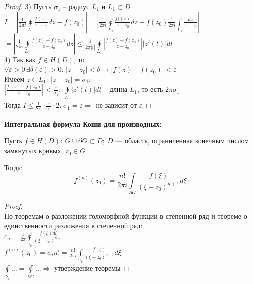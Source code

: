 \begin{proof}
    3) Пусть $\sigma_1$ -- радиус $L_1$ и $L_1 \subset D$\\
    $I = \left| \frac{1}{2\pi i } \oint\limits_{L_1} \frac{f(z)}{z-z_0}dz-f(z_0) \right| = \left| \frac{1}{2\pi i} \oint\limits_{L_1} \frac{f)(z)}{z-z_0}dz - f(z_0)\frac{1}{2\pi i}\int\limits_{L_1} \frac{dz}{z-z_0}\right| = $\\
    $= \left| \frac{1}{2\pi i}\oint\limits_{L_1} \frac{f(z)-f(z_0)}{z-z_0}dz \right| \leq \frac{1}{2\pi |i|} \oint\limits_{L_1}\left| \frac{f(z)-f(z_0)}{z-z_0} \right||z'(t)|dt$\\

    4) Так как $f \in H(D)$, то $\forall \varepsilon > 0 \, \exists \delta (\varepsilon)>0: \, |z-z_0|<\delta \rightarrow |f(z)-f(z_0)|<\varepsilon$\\
    Имеем $z\in L_1: \ |z-z_0| = \sigma_1$:\\
    $\left| \frac{f(z)-f(z_0)}{z-z_0} \right|< \frac{\varepsilon}{\sigma_1}: \ \oint\limits_{L_1}|z'(t)|dt$ -- длина $L_1$, то есть $2\pi \sigma_1$\\
    Тогда $I \leq \frac{1}{2\pi}\cdot \frac{\varepsilon}{\gamma_1}\cdot 2\pi \sigma_1 = \varepsilon \Rightarrow$ не зависит от $\varepsilon$ 

\end{proof}
\textbf{Интегральная формула Коши для производных:}

Пусть $f\in H(D): \ G\cup \partial G \subset D; \ D$ --- область, ограниченная конечным числом замкнутых кривых, $z_0 \in G$

Тогда:
$$f^{(n)}(z_0) = \frac{n!}{2\pi i} \int\limits_{\partial G}\frac{f(\xi)}{(\xi-z_0)^{n+1}}d\xi$$

\begin{proof}
    \ \\
    По теоремам о разложении голоморфной функции в степенной ряд и теореме о единственности разложения в степенной ряд:\\
    $c_n=\frac{1}{2\pi} \oint\limits_{{\gamma}_r} \frac{f(\xi)d\xi}{(\xi-z_0)^{n+1}}$ \\[2mm]
    $f^{(n)}(z_0) = c_n n! = \frac{n!}{2 \pi i}\int \limits_{{\gamma}_r} \frac{f(\xi)}{(\xi - z_0)^{n+1}}d\xi$ \\[2mm]
    $\oint\limits_{{\gamma}_r}\dots=\oint\limits_{\partial G}\dots \Rightarrow$ утверждение теоремы
\end{proof}
